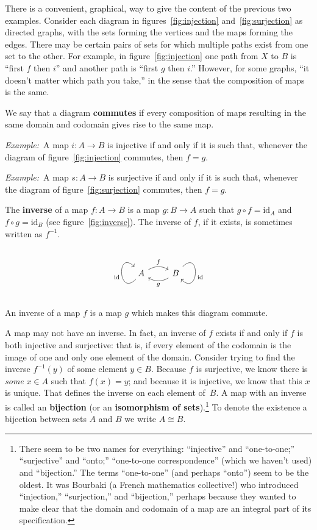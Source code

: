 \documentclass[12pt, a4paper]{article}
\newcommand{\defn}[1]{\textbf{#1}}
\newcommand{\eg}{\emph{Example:}\relax}
\newcommand{\id}{\text{id}}
\begin{document}
There is a convenient, graphical, way to give the content of the
previous two examples. Consider each diagram in
figures~\ref{fig:injection} and~\ref{fig:surjection} as directed
graphs, with the sets forming the vertices and the maps forming the
edges. There may be certain pairs of sets for which multiple paths
exist from one set to the other. For example, in
figure~\ref{fig:injection} one path from $X$ to $B$ is “first $f$ then
$i$” and another path is “first $g$ then $i$.” However, for some
graphs, “it doesn't matter which path you take,” in the sense that the
composition of maps is the same.

We say that a diagram \defn{commutes} if every composition of maps
resulting in the same domain and codomain gives rise to the same map.

\eg\ A map $i\colon A\to B$ is injective if and only if it is such that,
whenever the diagram of figure~\ref{fig:injection} commutes, then
$f=g$.

\eg\ A map $s\colon A\to B$ is surjective if and only if it is such that,
whenever the diagram of figure~\ref{fig:surjection} commutes, then
$f=g$.

The \defn{inverse} of a map $f\colon A\to B$ is a map $g\colon B\to A$
such that $g\circ f = \id_A$ and $f\circ g = \id_B$ (see
figure~\ref{fig:inverse}). The inverse of $f$, if it exists, is
sometimes written as $f^{-1}$.
\begin{sidefigure}
  \[\begin{tikzcd}
  A \arrow[loop left, out=225, in=135, distance=3em, "\id"] \arrow[r, bend
      left, "f"] &
    B \arrow[l, bend left, "g"] \arrow[loop right, out=45, in=-45,
      distance=3em, "\id"]
  \end{tikzcd}\]
  \caption{An inverse of a map $f$ is a map $g$ which makes this
    diagram commute.\label{fig:inverse}}
\end{sidefigure}
A map may not have an inverse. In fact, an inverse of $f$ exists if
and only if $f$ is both injective and surjective: that is, if every
element of the codomain is the image of one and only one element of
the domain. Consider trying to find the inverse $f^{-1}(y)$ of some
element $y\in B$. Because $f$ is surjective, we know there is
\emph{some} $x\in A$ such that $f(x) = y$; and because it is injective,
we know that this $x$ is unique. That defines the inverse on each
element of~$B$. A map with an inverse is called an \defn{bijection}
(or an \defn{isomorphism of sets}).\footnote{There seem to be two
names for everything: “injective” and “one-to-one;” “surjective” and
“onto;” “one-to-one correspondence” (which we haven't used) and
“bijection.”  The terms “one-to-one” (and perhaps “onto”) seem to be
the oldest. It was Bourbaki (a French mathematics collective!) who
introduced “injection,” “surjection,” and “bijection,” perhaps because
they wanted to make clear that the domain and codomain of a map are an
integral part of its specification.} To denote the existence a
bijection between sets $A$ and $B$ we write $A\cong B$.
\end{document}
